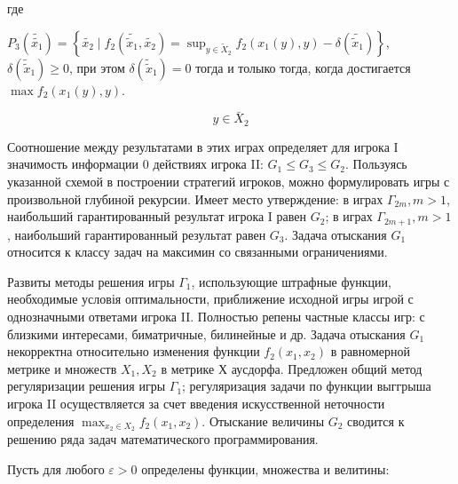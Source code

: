 \documentclass[10pt]{article}
\begin{document}
где



$P_{3}\left(\tilde{\tilde{x_{1}}}\right)=\left\{\tilde{x_{2}} \mid f_{2}\left(\tilde{\tilde{x}_{1}}, \tilde{x_{2}}\right)=\sup _{y \in \tilde{X}_{2}} f_{2}\left(x_{1}(y), y\right)-\delta\left(\tilde{\tilde{x}_{1}}\right)\right\}$, $\delta\left(\tilde{\tilde{x}}_{1}\right) \geqslant 0$, при этом $\delta\left(\tilde{\tilde{x}}_{1}\right)=0$ тогда и толыко тогда, когда достигается $\max f_{2}\left(x_{1}(y), y\right)$.



\[

y \in \bar{X}_{2}

\]



Соотношение между результатами в этих играх определяет для игрока I значимость информации 0 действиях игрока II: $G_{1} \leqslant G_{3} \leqslant G_{2}$. Пользуясь указанной схемой в построении стратегий игроков, можно формулировать игры с произвольной глубиной рекурсии. Имеет место утверждение: в играх $\Gamma_{2 m}, m>1$, наибольший гарантированный результат игрока I равен $G_{2}$; в играх $\Gamma_{2 m+1}, m>1$, наибольший гарантированный результат равен $G_{3}$. Задача отыскания $G_{1}$ относится к классу задач на максимин со связанными ограничениями.



Развиты методы решения игры $\Gamma_{1}$, использующие штрафные функции, необходимые условія оптимальности, приближение исходной игры игрой с однозначными ответами игрока II. Полностью репены частные классы игр: с близкими интересами, биматричные, билинейные и др. Задача отыскания $G_{1}$ некорректна относительно изменения функции $f_{2}\left(x_{1}, x_{2}\right)$ в равномерной метрике и множеств $X_{1}, X_{2}$ в метрике Х аусдорфа. Предложен общий метод регуляризации решения игры $\Gamma_{1}$; регуляризация задачи по функции выггрыша игрока II осуществляется за счет введения искусственной неточности определения $\max _{x_{2} \in X_{2}} f_{2}\left(x_{1}, x_{2}\right)$. Отыскание величины $G_{2}$ сводится к решению ряда задач математического программирования.



Пусть для любого $\varepsilon>0$ определены функции, множества и велитины:
\end{document}
